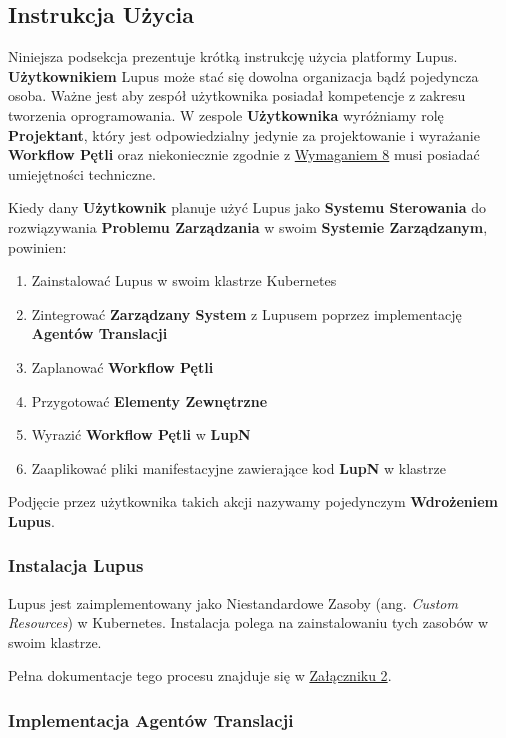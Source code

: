 \subsection{Instrukcja Użycia}

Niniejsza podsekcja prezentuje krótką instrukcję użycia platformy Lupus. \textbf{Użytkownikiem} Lupus może stać się dowolna organizacja bądź pojedyncza osoba. Ważne jest aby zespół użytkownika posiadał kompetencje z zakresu tworzenia oprogramowania. W zespole \textbf{Użytkownika} wyróżniamy rolę \textbf{Projektant}, który jest odpowiedzialny jedynie za projektowanie i wyrażanie \textbf{Workflow Pętli} oraz niekoniecznie zgodnie z \hyperref[req:8]{Wymaganiem 8} musi posiadać umiejętności techniczne. 

Kiedy dany \textbf{Użytkownik} planuje użyć Lupus jako \textbf{Systemu Sterowania} do rozwiązywania \textbf{Problemu Zarządzania} w swoim \textbf{Systemie Zarządzanym}, powinien:
\begin{enumerate}
    \item Zainstalować Lupus w swoim klastrze Kubernetes
    \item Zintegrować \textbf{Zarządzany System} z Lupusem poprzez implementację \textbf{Agentów Translacji}
    \item Zaplanować \textbf{Workflow Pętli}
    \item Przygotować \textbf{Elementy Zewnętrzne} 
    \item Wyrazić \textbf{Workflow Pętli} w \textbf{LupN} 
    \item Zaaplikować pliki manifestacyjne zawierające kod \textbf{LupN} w klastrze
\end{enumerate}

Podjęcie przez użytkownika takich akcji nazywamy pojedynczym \textbf{Wdrożeniem Lupus}.

\subsubsection{Instalacja Lupus}

Lupus jest zaimplementowany jako Niestandardowe Zasoby (ang. \textit{Custom Resources}) w Kubernetes. Instalacja polega na zainstalowaniu tych zasobów w swoim klastrze. 

Pełna dokumentacje tego procesu znajduje się w \hyperref[appendix:2]{Załączniku 2}.

\subsubsection{Implementacja Agentów Translacji}

